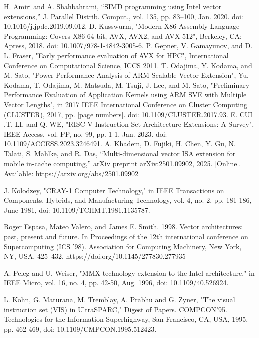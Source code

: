 \documentclass[conference]{IEEEtran}
\begin{document}
\begin{thebibliography}{00}
 H. Amiri and A. Shahbahrami, “SIMD programming using Intel vector extensions,” J. Parallel Distrib. Comput., vol. 135, pp. 83–100, Jan. 2020. doi: 10.1016/j.jpdc.2019.09.012.
 D. Kusswurm, "Modern X86 Assembly Language Programming: Covers X86 64-bit, AVX, AVX2, and AVX-512", Berkeley, CA: Apress, 2018. doi: 10.1007/978-1-4842-3005-6.
 P. Gepner, V. Gamayunov, and D. L. Fraser, "Early performance evaluation of AVX for HPC", International Conference on Computational Science, ICCS 2011.
 T. Odajima, Y. Kodama, and M. Sato, "Power Performance Analysis of ARM Scalable Vector Extension", 
 Yu. Kodama, T. Odajima, M. Matsuda, M. Tsuji, J. Lee, and M. Sato, "Preliminary Performance Evaluation of Application Kernels using ARM SVE with Multiple Vector Lengths", in 2017 IEEE International Conference on Cluster Computing (CLUSTER), 2017, pp. [page numbers]. doi: 10.1109/CLUSTER.2017.93.
 E. CUI ,T. LI, and Q. WE, "RISC-V Instruction Set Architecture Extensions: A Survey",  IEEE Access, vol. PP, no. 99, pp. 1-1, Jan. 2023. doi: 10.1109/ACCESS.2023.3246491.
 A. Khadem, D. Fujiki, H. Chen, Y. Gu, N. Talati, S. Mahlke, and R. Das, “Multi-dimensional vector ISA extension for mobile in-cache computing,” arXiv preprint arXiv:2501.09902, 2025. [Online]. Available: https://arxiv.org/abs/2501.09902

 J. Kolodzey, "CRAY-1 Computer Technology," in IEEE Transactions on Components, Hybrids, and Manufacturing Technology, vol. 4, no. 2, pp. 181-186, June 1981, doi: 10.1109/TCHMT.1981.1135787.

 Roger Espasa, Mateo Valero, and James E. Smith. 1998. Vector architectures: past, present and future. In Proceedings of the 12th international conference on Supercomputing (ICS '98). Association for Computing Machinery, New York, NY, USA, 425–432. https://doi.org/10.1145/277830.277935

 A. Peleg and U. Weiser, "MMX technology extension to the Intel architecture," in IEEE Micro, vol. 16, no. 4, pp. 42-50, Aug. 1996, doi: 10.1109/40.526924.

 L. Kohn, G. Maturana, M. Tremblay, A. Prabhu and G. Zyner, "The visual instruction set (VIS) in UltraSPARC," Digest of Papers. COMPCON'95. Technologies for the Information Superhighway, San Francisco, CA, USA, 1995, pp. 462-469, doi: 10.1109/CMPCON.1995.512423.


\end{thebibliography}
\end{document}
